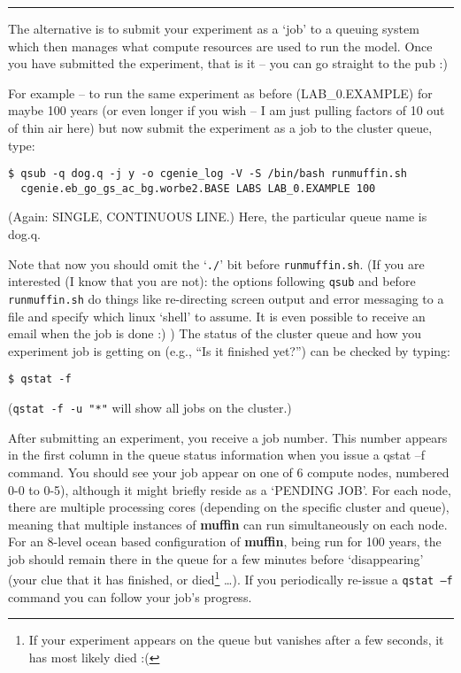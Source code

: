 \documentclass[11pt,fleqn]{book} %
\begin{document}
\vspace{1mm}
\noindent\rule{4cm}{0.1mm}
\vspace{2mm}

\noindent The alternative is to submit your experiment as a ‘job’ to a queuing system which then manages what compute resources are used to run the model. Once you have submitted the experiment, that is it – you can go straight to the pub :)

For example -- to run the same experiment as before (\textsf{\footnotesize LAB\_0.EXAMPLE}) for maybe 100 years (or even longer if you wish – I am just pulling factors of 10 out of thin air here) but now submit the experiment as a job to the cluster queue, type:
\vspace{-1mm}
\small\begin{verbatim}
$ qsub -q dog.q -j y -o cgenie_log -V -S /bin/bash runmuffin.sh
  cgenie.eb_go_gs_ac_bg.worbe2.BASE LABS LAB_0.EXAMPLE 100
\end{verbatim}\normalsize
\vspace{-1mm}

\noindent(Again: SINGLE, CONTINUOUS LINE.) Here, the particular queue name is \textsf{\footnotesize dog.q}.

\vspace{1mm}
Note that now you should omit the ‘\texttt{./}’ bit before \texttt{runmuffin.sh}.
(If you are interested (I know that you are not): the options following \texttt{qsub} and before \texttt{runmuffin.sh} do things like re-directing screen output and error messaging to a file and specify which linux ‘shell’ to assume. It is even possible to receive an email when the job is done :) )
The status of the cluster queue and how you experiment job is getting on (e.g., “Is it finished yet?”) can be checked by typing:
\vspace{-1mm}
\small\begin{verbatim}
$ qstat -f
\end{verbatim}\normalsize
\vspace{-1mm}
(\texttt{qstat -f -u "*"} will show all jobs on the cluster.)

\vspace{1mm}
After submitting an experiment, you receive a job number. This number appears in the first column in the queue status information when you issue a qstat –f command. You should see your job appear on one of 6 compute nodes, numbered 0-0 to 0-5), although it might briefly reside as a ‘\textsf{\footnotesize PENDING JOB}’. For each node, there are multiple processing cores (depending on the specific cluster and queue), meaning that multiple instances of \textbf{muffin} can run simultaneously on each node. For an 8-level ocean based configuration of \textbf{muffin}, being run for 100 years, the job should remain there in the queue for a few minutes before ‘disappearing’ (your clue that it has finished, or died\footnote{If your experiment appears on the queue but vanishes after a few seconds, it has most likely died :(} …). If you periodically re-issue a \texttt{qstat –f} command you can follow your job’s progress.
\end{document}
